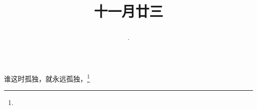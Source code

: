 \title{\date[d=4,m=1,y=2024][year:cn-y,年,month:cn,day:cn,日,·,weekday]·十一月廿三 }
谁这时孤独，就永远孤独，\footnote{ }

